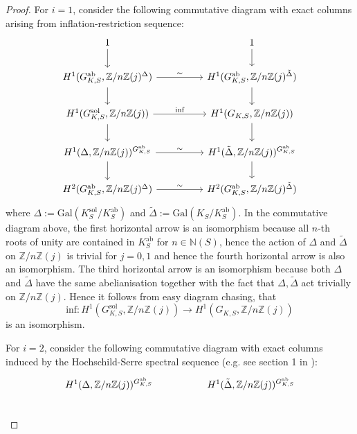 \documentclass{article}
\theoremstyle{plain}
\theoremstyle{definition}
\theoremstyle{remark}
\begin{document}
\begin{proof}
For $i = 1$, consider the following commutative diagram with exact columns arising from inflation-restriction sequence:
$$
\begin{tikzcd}
	1 && 1 \\
	{H^1(G_{K,S}^{\text{ab}},\mathbb Z/n\mathbb Z(j)^{\Delta})} && {H^1(G_{K,S}^{\text{ab}},\mathbb Z/n\mathbb Z(j)^{\tilde \Delta} )} \\
	{H^1(G_{K,S}^{\text{sol}},\mathbb Z/n\mathbb Z(j))} && {H^1(G_{K,S},\mathbb Z/n\mathbb Z(j))} \\
	{H^1(\Delta,\mathbb Z/n\mathbb Z(j))^{G_{K,S}^{\text{ab}}}} && {H^1(\tilde \Delta,\mathbb Z/n \mathbb Z(j))^{G_{K,S}^{\text{ab}}}} \\
	{H^2(G_{K,S}^{\text{ab}},\mathbb Z/n\mathbb Z(j)^{\Delta})} && {H^2(G_{K,S}^{\text{ab}},\mathbb Z/n\mathbb Z(j)^{\tilde \Delta})}
	\arrow[from=1-1, to=2-1]
	\arrow[from=1-3, to=2-3]
	\arrow["\sim", from=2-1, to=2-3]
	\arrow[from=2-1, to=3-1]
	\arrow[from=2-3, to=3-3]
	\arrow["{\text{inf}}", from=3-1, to=3-3]
	\arrow[from=3-1, to=4-1]
	\arrow[from=3-3, to=4-3]
	\arrow["\sim", from=4-1, to=4-3]
	\arrow[from=4-1, to=5-1]
	\arrow[from=4-3, to=5-3]
	\arrow["\sim", from=5-1, to=5-3]
\end{tikzcd}
$$
where $\Delta := \text{Gal}(K_{S}^{\text{sol}}/K_{S}^{\text{ab}})$ and $\tilde \Delta := \text{Gal}(K_{S}/K_{S}^{\text{ab}})$. In the commutative diagram above, the first horizontal arrow is an isomorphism because all $n$-th roots of unity are contained in $K_{S}^{\text{ab}}$ for $n \in \mathbb N(S)$, hence the action of $\Delta$ and $\tilde \Delta$ on $\mathbb Z/n\mathbb Z(j)$ is trivial for $j = 0,1$ and hence the fourth horizontal arrow is also an isomorphism. The third horizontal arrow is an isomorphism because both $\Delta$ and $\tilde \Delta$ have the same abelianisation together with the fact that $\Delta,\tilde \Delta$ act trivially on $\mathbb Z/n\mathbb Z(j)$. Hence it follows from easy diagram chasing, that
$$
\text{inf}: H^1(G_{K,S}^{\text{sol}},\mathbb Z/n\mathbb Z(j)) \to H^1(G_{K,S},\mathbb Z/n\mathbb Z(j))
$$
is an isomorphism. \par 
For $i = 2$, consider the following commutative diagram with exact columns induced by the Hochschild-Serre spectral sequence (e.g. see section 1 in \cite{S-extn}):
$$
\begin{tikzcd}
	{H^1(\Delta,\mathbb Z/n\mathbb Z(j))^{G_{K,S}^{\text{ab}}}} && {H^1(\tilde \Delta,\mathbb Z/n\mathbb Z(j))^{G_{K,S}^{\text{ab}}}} \\

\end{tikzcd}$$
\end{proof}
\end{document}
